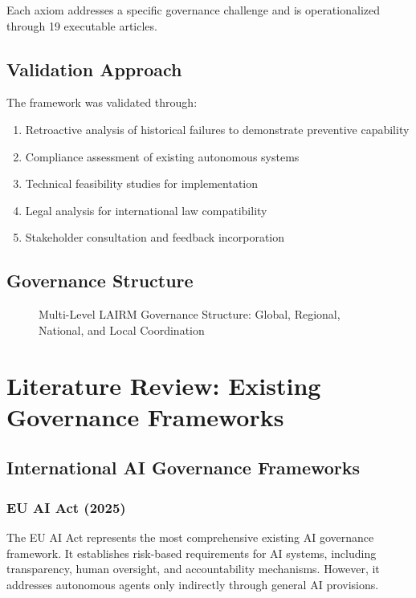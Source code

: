 \documentclass[12pt,a4paper,twoside,openright]{book}
\begin{document}
Each axiom addresses a specific governance challenge and is operationalized through 19 executable articles.

\section{Validation Approach}

The framework was validated through:

\begin{enumerate}
    \item Retroactive analysis of historical failures to demonstrate preventive capability
    \item Compliance assessment of existing autonomous systems
    \item Technical feasibility studies for implementation
    \item Legal analysis for international law compatibility
    \item Stakeholder consultation and feedback incorporation
\end{enumerate}

\vspace{0.5cm}

\section{Governance Structure}

\begin{figure}[h]
\centering

\caption{Multi-Level LAIRM Governance Structure: Global, Regional, National, and Local Coordination}
\label{fig:governance-structure}
\end{figure}

\chapter{Literature Review: Existing Governance Frameworks}
\label{ch:literature}

\section{International AI Governance Frameworks}

\subsection{EU AI Act (2025)}

The EU AI Act represents the most comprehensive existing AI governance framework. It establishes risk-based requirements for AI systems, including transparency, human oversight, and accountability mechanisms. However, it addresses autonomous agents only indirectly through general AI provisions.
\end{document}

